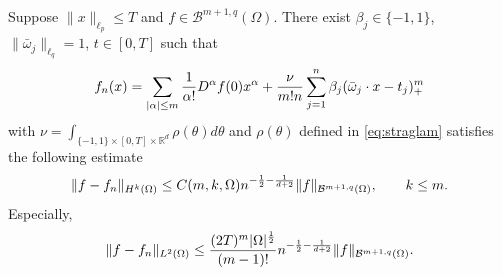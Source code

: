 \begin{theorem}\label{lem:stratifiedapprox2}
Suppose $\|x\|_{\ell_p}\le T$ and $f\in \mathcal{B}^{m+1, q}(\Omega)$.
There exist $\beta_j\in \{-1, 1\}$, $\|\bar \omega_j\|_{\ell_q}=1$, $t\in [0,T]$ such that 
$$
f_n(x)= \sum_{|\alpha|\le m}{1\over \alpha!}D^\alpha f(0) x^\alpha + {\nu\over m!n}\sum_{j=1}^{n}\beta_j (\bar \omega_j\cdot x - t_j)_+^m
$$ 
with $\nu=\int_{\{-1,1\}\times [0,T]\times \mathbb{R}^{d}} \rho(\theta)d\theta$ and $\rho(\theta)$  defined in \eqref{eq:straglam} 
satisfies the following estimate
\begin{equation}
\|f - f_n \|_{H^k(\Omega)} \leq C(m,k,\Omega) n^{-{1\over 2}-{1\over d+2}}\|f\|_{\mathcal B^{m+1, q}(\Omega)},\qquad k\le m.
\end{equation} 
Especially,
\begin{equation}
\|f - f_n \|_{L^2(\Omega)} \leq {(2T)^m|\Omega|^{1\over 2}\over (m-1)!} n^{-{1\over 2}-{1\over d+2}}\|f\|_{\mathcal B^{m+1, q}(\Omega)}.
\end{equation} 
\end{theorem} 
